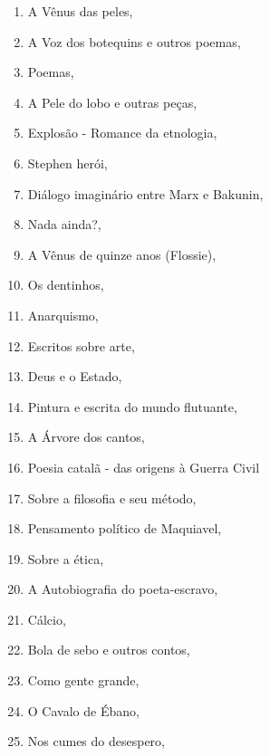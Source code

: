 \begin{multicols}{2}
\begin{enumerate}
\item A Vênus das peles, {}
\item A Voz dos botequins e outros poemas, {}
\item Poemas, {}
\item A Pele do lobo e outras peças, {}
\item Explosão - Romance da etnologia, {}
\item Stephen herói, {}
\item Diálogo imaginário entre Marx e Bakunin, {}
\item Nada ainda?, {}
\item A Vênus de quinze anos (Flossie), {}
\item Os dentinhos, {}
\item Anarquismo, {}
\item Escritos sobre arte, {}
\item Deus e o Estado, {}
\item Pintura e escrita do mundo flutuante, {}
\item A Árvore dos cantos, {}
\item Poesia catalã - das origens à Guerra Civil
\item Sobre a filosofia e seu método, {}
\item Pensamento político de Maquiavel, {}
\item Sobre a ética, {}
\item A Autobiografia do poeta-escravo, {}
\item Cálcio, {}
\item Bola de sebo e outros contos, {}
\item Como gente grande, {}
\item O Cavalo de Ébano, {}
\item Nos cumes do desespero, {}

\end{enumerate}
\end{multicols}
